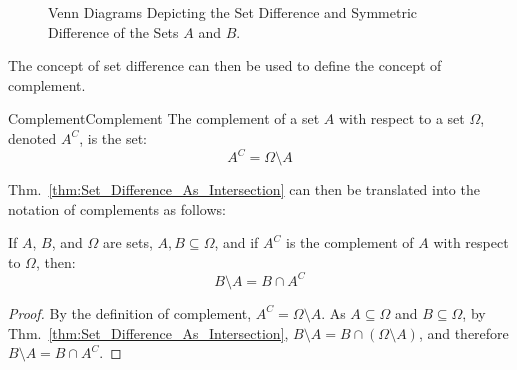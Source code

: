             \begin{figure}[H]
                \centering
                \captionsetup{type=figure}
                \begin{subfigure}[b]{0.49\textwidth}
                    \centering
                    
                \end{subfigure}
                \begin{subfigure}[b]{0.49\textwidth}
                    \centering
                    
                \end{subfigure}
                \caption[Venn Diagrams for Set Difference
                         and Symmetric Difference]
                        {Venn Diagrams Depicting the Set
                         Difference and Symmetric Difference
                         of the Sets $A$ and $B$.}
                \label{fig:Difference_Sym_Venn_Diagram}
            \end{figure}
            The concept of set difference can then be used to
            define the concept of complement.
            \begin{ldefinition}{Complement}{Complement}
                The complement of a set $A$ with respect to a set
                $\Omega$, denoted $A^{C}$, is the set:
                \begin{equation}
                    A^{C}=\Omega\setminus{A}
                \end{equation}
            \end{ldefinition}
            Thm.~\ref{thm:Set_Difference_As_Intersection}
            can then be translated into the notation of
            complements as follows:
            \begin{theorem}
                If $A$, $B$, and $\Omega$ are sets,
                $A,B\subseteq\Omega$, and if $A^{C}$ is the
                complement of $A$ with respect to $\Omega$, then:
                \begin{equation}
                    B\setminus{A}=B\cap{A}^{C}
                \end{equation}
            \end{theorem}
            \begin{proof}
                By the definition of complement,
                $A^{C}=\Omega\setminus{A}$.
                As $A\subseteq\Omega$ and $B\subseteq\Omega$, by
                Thm.~\ref{thm:Set_Difference_As_Intersection},
                $B\setminus{A}=B\cap(\Omega\setminus{A})$,
                and therefore $B\setminus{A}=B\cap{A}^{C}$.
            \end{proof}
